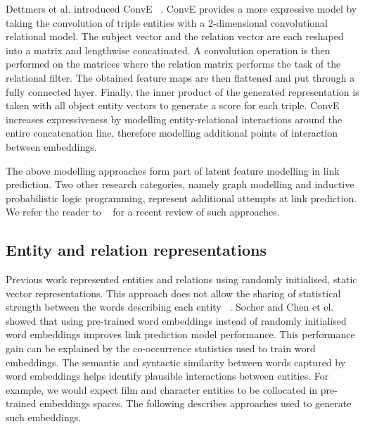 \noindent Dettmers et al. introduced ConvE \unskip~\citep{dettmers2018convolutional}. ConvE provides a more expressive model by taking the convolution of triple entities with a 2-dimensional convolutional relational model. The subject vector and the relation vector are each reshaped into a matrix and lengthwise concatinated. A convolution operation is then performed on the matrices where the relation matrix performs the task of the relational filter. The obtained feature maps are then flattened and put through a fully connected layer. Finally, the inner product of the generated representation is taken with all object entity vectors to generate a score for each triple. ConvE  increases expressiveness by modelling entity-relational interactions  around the entire concatenation line, therefore modelling additional points of interaction between embeddings. \par

\noindent The above modelling approaches form part of latent feature modelling in link prediction. Two other research categories, namely graph modelling and inductive probabilistic logic programming, represent additional attempts at link prediction. We refer the reader to \unskip~\citep{nickel2015review} for a recent review of such approaches. \par

\subsection{Entity and relation representations} 

\noindent Previous work represented entities and relations using randomly initialised, static vector representations. This approach does not allow the sharing of statistical strength between the words describing each entity \unskip~\citep{socher2013reasoning}. Socher and Chen et el. showed that using pre-trained word embeddings instead of randomly initialised word embeddings improves link prediction model performance. This performance gain can be explained by the co-occurrence statistics used to train word embeddings. The semantic and syntactic similarity between words captured by word embeddings helps identify plausible interactions between entities. For example, we would expect film and character entities to be collocated in pre-trained embeddings spaces. The following describes approaches used to generate such embeddings. \par

